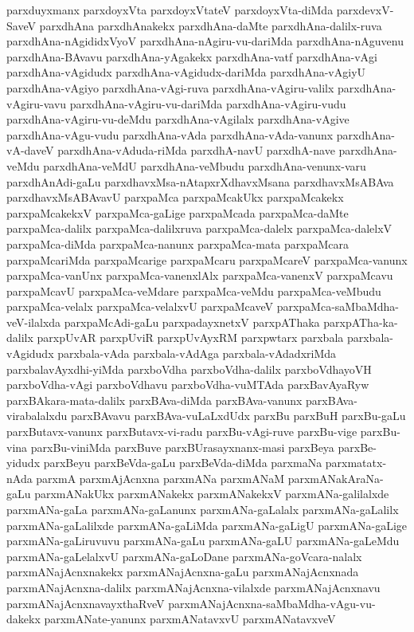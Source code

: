 {parxduyxmanx
parxdoyxVta
parxdoyxVtateV
parxdoyxVta-diMda
parxdevxV-SaveV
parxdhAna
parxdhAnakekx
parxdhAna-daMte
parxdhAna-dalilx-ruva
parxdhAna-nAgididxVyoV
parxdhAna-nAgiru-vu-dariMda
parxdhAna-nAguvenu
parxdhAna-BAvavu
parxdhAna-yAgakekx
parxdhAna-vatf
parxdhAna-vAgi
parxdhAna-vAgidudx
parxdhAna-vAgidudx-dariMda
parxdhAna-vAgiyU
parxdhAna-vAgiyo
parxdhAna-vAgi-ruva
parxdhAna-vAgiru-valilx
parxdhAna-vAgiru-vavu
parxdhAna-vAgiru-vu-dariMda
parxdhAna-vAgiru-vudu
parxdhAna-vAgiru-vu-deMdu
parxdhAna-vAgilalx
parxdhAna-vAgive
parxdhAna-vAgu-vudu
parxdhAna-vAda
parxdhAna-vAda-vanunx
parxdhAna-vA-daveV
parxdhAna-vAduda-riMda
parxdhA-navU
parxdhA-nave
parxdhAna-veMdu
parxdhAna-veMdU
parxdhAna-veMbudu
parxdhAna-venunx-varu
parxdhAnAdi-gaLu
parxdhavxMsa-nAtapxrXdhavxMsana
parxdhavxMsABAva
parxdhavxMsABAvavU
parxpaMca
parxpaMcakUkx
parxpaMcakekx
parxpaMcakekxV
parxpaMca-gaLige
parxpaMcada
parxpaMca-daMte
parxpaMca-dalilx
parxpaMca-dalilxruva
parxpaMca-dalelx
parxpaMca-dalelxV
parxpaMca-diMda
parxpaMca-nanunx
parxpaMca-mata
parxpaMcara
parxpaMcariMda
parxpaMcarige
parxpaMcaru
parxpaMcareV
parxpaMca-vanunx
parxpaMca-vanUnx
parxpaMca-vanenxlAlx
parxpaMca-vanenxV
parxpaMcavu
parxpaMcavU
parxpaMca-veMdare
parxpaMca-veMdu
parxpaMca-veMbudu
parxpaMca-velalx
parxpaMca-velalxvU
parxpaMcaveV
parxpaMca-saMbaMdha-veV-ilalxda
parxpaMcAdi-gaLu
parxpadayxnetxV
parxpAThaka
parxpATha-ka-dalilx
parxpUvAR
parxpUviR
parxpUvAyxRM
parxpwtarx
parxbala
parxbala-vAgidudx
parxbala-vAda
parxbala-vAdAga
parxbala-vAdadxriMda
parxbalavAyxdhi-yiMda
parxboVdha
parxboVdha-dalilx
parxboVdhayoVH
parxboVdha-vAgi
parxboVdhavu
parxboVdha-vuMTAda
parxBavAyaRyw
parxBAkara-mata-dalilx
parxBAva-diMda
parxBAva-vanunx
parxBAva-virabalalxdu
parxBAvavu
parxBAva-vuLaLxdUdx
parxBu
parxBuH
parxBu-gaLu
parxButavx-vanunx
parxButavx-vi-radu
parxBu-vAgi-ruve
parxBu-vige
parxBu-vina
parxBu-viniMda
parxBuve
parxBUrasayxnanx-masi
parxBeya
parxBe-yidudx
parxBeyu
parxBeVda-gaLu
parxBeVda-diMda
parxmaNa
parxmatatx-nAda
parxmA
parxmAjAcnxna
parxmANa
parxmANaM
parxmANakAraNa-gaLu
parxmANakUkx
parxmANakekx
parxmANakekxV
parxmANa-galilalxde
parxmANa-gaLa
parxmANa-gaLanunx
parxmANa-gaLalalx
parxmANa-gaLalilx
parxmANa-gaLalilxde
parxmANa-gaLiMda
parxmANa-gaLigU
parxmANa-gaLige
parxmANa-gaLiruvuvu
parxmANa-gaLu
parxmANa-gaLU
parxmANa-gaLeMdu
parxmANa-gaLelalxvU
parxmANa-gaLoDane
parxmANa-goVcara-nalalx
parxmANajAcnxnakekx
parxmANajAcnxna-gaLu
parxmANajAcnxnada
parxmANajAcnxna-dalilx
parxmANajAcnxna-vilalxde
parxmANajAcnxnavu
parxmANajAcnxnavayxthaRveV
parxmANajAcnxna-saMbaMdha-vAgu-vu-dakekx
parxmANate-yanunx
parxmANatavxvU
parxmANatavxveV
}
